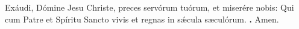 Exáudi, Dómine Jesu Christe, preces servórum tuórum, et miserére nobis: Qui cum Patre et Spíritu Sancto vivis et regnas in s\'{\ae}cula sæculórum. 
\textbf{\Rbar.} Amen.




